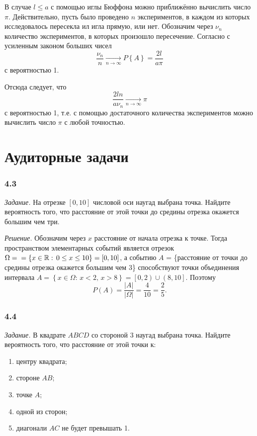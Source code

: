 В случае $l \leq a$ с помощью иглы Бюффона можно приближённо вычислить число $ \pi $.
Действительно, пусть было проведено $n$ экспериментов, в каждом из которых исследовалось пересекла ил игла прямую, или нет.
Обозначим через $ \nu_n$ количество экспериментов, в которых произошло пересечение.
Согласно с усиленным законом больших чисел
$$ \frac{ \nu_n}{n} \xrightarrow[n \rightarrow \infty ]{} P \left\{ A \right\} =
\frac{2l}{a \pi}$$
с вероятностью 1.

Отсюда следует, что
$$ \frac{2l n}{a \nu_n} \xrightarrow[n \rightarrow \infty ]{} \pi $$
с вероятностью 1, т.е. с помощью достаточного количества экспериментов можно вычислить число $ \pi $ с любой точностью.

\section*{Аудиторные задачи}

\subsubsection*{4.3}

\textit{Задание.} На отрезке $ \left[ 0, 10 \right] $ числовой оси наугад выбрана точка.
Найдите вероятность того, что расстояние от этой точки до средины отрезка окажется большим чем три.

\textit{Решение.} Обозначим через $x$ расстояние от начала отрезка к точке.
Тогда пространством элементарных событий является отрезок
$ \Omega = \\
= \left\{ x \in \mathbb{R}: \, 0 \leq x \leq 10 \right\} =
\left[ 0, 10 \right] $,
а событию $A$ =
\{расстояние от точки до средины отрезка окажется большим чем 3\}
способствуют точки объединения интервала
$A =
\left\{ x \in \Omega: \, x < 2, \, x > 8 \right\} =
\left[0, 2 \right) \cup \left(8, 10 \right] $.
Поэтому
$$P \left( A \right) =
\frac{|A|}{| \Omega |} =
\frac{4}{10} =
\frac{2}{5}.$$

\subsubsection*{4.4}

\textit{Задание.} В квадрате $ABCD$ со стороной 3 наугад выбрана точка.
Найдите вероятность того, что расстояние от этой точки к:
\begin{enumerate}[label=\alph*)]
\item центру квадрата;
\item стороне $AB$;
\item точке $A$;
\item одной из сторон;
\item диагонали $AC$ не будет превышать 1.
\end{enumerate}

